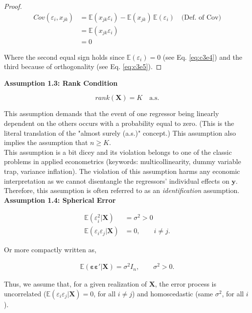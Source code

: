 \documentclass[]{book}
\theoremstyle{definition}
\theoremstyle{definition}
\theoremstyle{definition}
\theoremstyle{remark}
\let\BeginKnitrBlock\begin \let\EndKnitrBlock\end
\begin{document}
\BeginKnitrBlock{proof}
{}\begin{align*}
      Cov(\varepsilon_i,x_{jk}) &= \mathbb{E}(x_{jk}\varepsilon_i)-\mathbb{E}(x_{jk})\,\mathbb{E}(\varepsilon_i)\quad{\text{(Def.~of Cov)}}\\
       &= \mathbb{E}(x_{jk}\varepsilon_i)\\
       &= 0 
\end{align*}

Where the second equal sign holds since \(\mathbb{E}(\varepsilon_i)=0\) (see Eq. \eqref{eq:c3e4}) and the third because of orthogonality (see Eq. \eqref{eq:c3e5}).
\EndKnitrBlock{proof}

\textbf{Assumption 1.3: Rank Condition}

\[rank(\mathbf{X})=K\quad\text{a.s.}\]

This assumption demands that the event of one regressor being linearly
dependent on the others occurs with a probability equal to zero. (This
is the literal translation of the "almost surely (a.s.)" concept.)
This assumption also implies the assumption that \(n\geq K\).\\
This assumption is a bit dicey and its violation belongs to one of the
classic problems in applied econometrics (keywords: multicollinearity,
dummy variable trap, variance inflation). The violation of this
assumption harms any economic interpretation as we cannot disentangle
the regressors' individual effects on \(\mathbf{y}\). Therefore, this
assumption is often referred to as an \emph{identification} assumption.\\

\textbf{Assumption 1.4: Spherical Error}

\[
\begin{align*}
\mathbb{E}(\varepsilon_i^2|\mathbf{X}) &= \sigma^2>0\\
\mathbb{E}(\varepsilon_i\varepsilon_j|\mathbf{X}) &= 0,\quad\quad i\neq j.
\end{align*}
\]

Or more compactly written as,

\[
\begin{align*}
\mathbb{E}(\boldsymbol{\varepsilon}\boldsymbol{\varepsilon}'|\mathbf{X}) = \sigma^2 I_n,\quad\quad \sigma^2>0.
\end{align*}
\]

Thus, we assume that, for a given realization of \(\mathbf{X}\), the error
process is uncorrelated (\(\mathbb{E}(\varepsilon_i\varepsilon_j|\mathbf{X})=0\), for all
\(i\neq j\)) and homoscedastic (same \(\sigma^2\), for all \(i\)).
\end{document}
